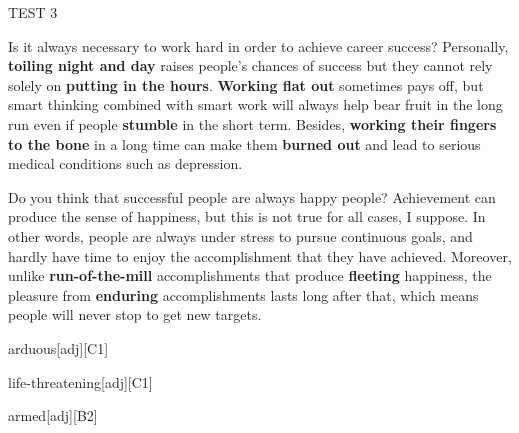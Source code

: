 \begin{glossarymc}[Cambridge 14]
\begin{test}{TEST 3}
    \begin{qa}{Is it always necessary to work hard in order to achieve career success?}
    Personally, \textbf{toiling night and day} raises people’s chances of success but they cannot rely solely on \textbf{putting in the hours}. \textbf{Working flat out} sometimes pays off, but smart thinking combined with smart work will always help bear fruit in the long run even if people \textbf{stumble} in the short term. Besides, \textbf{working their fingers to the bone} in a long time can make them \textbf{burned out} and lead to serious medical conditions such as depression.
    \end{qa}

    \begin{qa}{Do you think that successful people are always happy people?}
    Achievement can produce the sense of happiness, but this is not true for all cases, I suppose. In other words, people are always under stress to pursue continuous goals, and hardly have time to enjoy the accomplishment that they have achieved. Moreover, unlike \textbf{run-of-the-mill} accomplishments that produce \textbf{fleeting} happiness, the pleasure from \textbf{enduring} accomplishments lasts long after that, which means people will never stop to get new targets.
    \end{qa}
    
        \begin{VocabExplain}[Part 3]
            \begin{ExplainCard}{arduous}[adj][C1]
            \end{ExplainCard}

            \begin{ExplainCard}{life-threatening}[adj][C1]
            \end{ExplainCard}

            \begin{ExplainCard}{armed}[adj][B2]
            \end{ExplainCard}


\end{VocabExplain}
\end{test}
\end{glossarymc}
